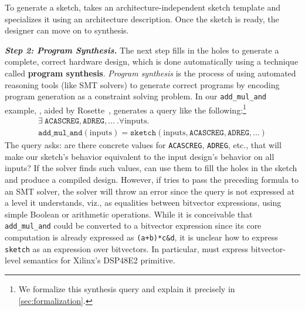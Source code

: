 To generate a sketch,
  \lr takes an architecture-independent
  sketch template
  and specializes it using an
  architecture description.
Once the sketch is ready,
  the designer can move on to synthesis.

\textit{\textbf{Step 2: Program Synthesis.}}
  The next step 
  fills
  in the holes to generate
  a complete, correct
  hardware design,
  which is done automatically
  using a technique called
  \textbf{program synthesis}.
\textit{Program synthesis} is the process of
  using automated reasoning tools
  (like SMT solvers) 
  to generate correct programs
  by encoding program generation
  as a constraint solving problem.
In our \texttt{add\_mul\_and} example,
  \lr, aided  by
  Rosette~\cite{torlak2013growing,torlak2014lightweight}, 
  generates a query like the following:\footnote{
  We formalize this synthesis query and explain it precisely in \cref{sec:formalization}.
}
\footnotesize
\begin{multline*}
\exists \ \mathtt{ACASCREG}, \mathtt{ADREG}, ...\ . \forall \mathrm{inputs}. \\
  \texttt{add\_mul\_and}(\mathrm{inputs}) 
  = \texttt{sketch}(\mathrm{inputs}, \mathtt{ACASCREG}, \mathtt{ADREG}, ...)
\end{multline*}
\normalsize
The query asks:
  are there concrete values for
  \texttt{ACASCREG}, \texttt{ADREG}, etc.,
  that will make our sketch's behavior
  equivalent to the input design's behavior
  on all inputs?
If the solver finds such values,
\lr can use them to fill the holes
  in the sketch
  and produce a compiled design.
However, if \lr tries to pass the preceding formula
  to an SMT solver,
  the solver will throw an error since
  the query is not expressed
  at a level 
 it understands, viz., %
  as equalities
  between bitvector expressions,
  using simple Boolean or arithmetic
  operations.
While it is conceivable that \texttt{add\_mul\_and}
  could be converted to
  a bitvector expression
  since its core computation is already
  expressed as
  \texttt{(a+b)*c\&d},
it is unclear how to express
  \texttt{sketch}
  as an expression over bitvectors.
In particular, \lr must express
  bitvector-level semantics
  for Xilinx's DSP48E2 primitive.


